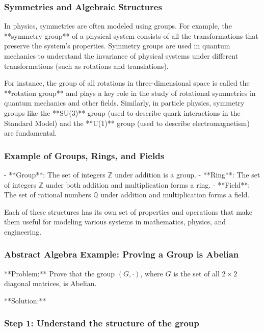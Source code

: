 \documentclass{article}
\begin{document}
\subsubsection*{Symmetries and Algebraic Structures}

In physics, symmetries are often modeled using groups. For example, the **symmetry group** of a physical system consists of all the transformations that preserve the system's properties. Symmetry groups are used in quantum mechanics to understand the invariance of physical systems under different transformations (such as rotations and translations).

For instance, the group of all rotations in three-dimensional space is called the **rotation group** and plays a key role in the study of rotational symmetries in quantum mechanics and other fields. Similarly, in particle physics, symmetry groups like the **SU(3)** group (used to describe quark interactions in the Standard Model) and the **U(1)** group (used to describe electromagnetism) are fundamental.

\subsubsection*{Example of Groups, Rings, and Fields}

- **Group**: The set of integers \( \mathbb{Z} \) under addition is a group.
- **Ring**: The set of integers \( \mathbb{Z} \) under both addition and multiplication forms a ring.
- **Field**: The set of rational numbers \( \mathbb{Q} \) under addition and multiplication forms a field.

Each of these structures has its own set of properties and operations that make them useful for modeling various systems in mathematics, physics, and engineering.

\subsubsection{Abstract Algebra Example: Proving a Group is Abelian}

**Problem:**
Prove that the group \( (G, \cdot) \), where \( G \) is the set of all \( 2 \times 2 \) diagonal matrices, is Abelian.

**Solution:**

\subsubsection*{Step 1: Understand the structure of the group}
\end{document}
